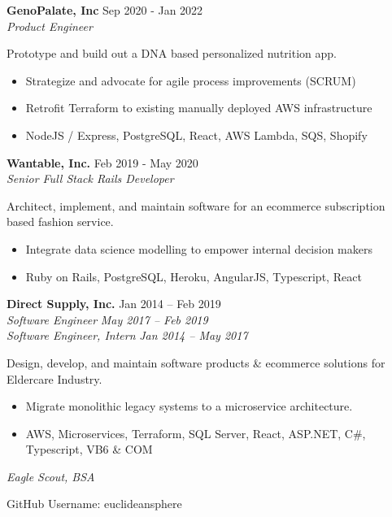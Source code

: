 \documentclass[line,margin]{res}
\begin{document}
\begin{resume}
\textbf{GenoPalate, Inc} \hfill Sep 2020 - Jan 2022 \\
{\sl Product Engineer}

Prototype and build out a DNA based personalized nutrition app.

\begin{itemize}
\item Strategize and advocate for agile process improvements (SCRUM)
\item Retrofit Terraform to existing manually deployed AWS infrastructure
\item NodeJS / Express, PostgreSQL, React, AWS Lambda, SQS, Shopify
\end{itemize}

\textbf{Wantable, Inc.} \hfill Feb 2019 - May 2020 \\
{\sl Senior Full Stack Rails Developer}

Architect, implement, and maintain software for an ecommerce subscription based fashion service.

\begin{itemize}
\item Integrate data science modelling to empower internal decision makers
\item Ruby on Rails, PostgreSQL, Heroku, AngularJS, Typescript, React
\end{itemize}

\textbf{Direct Supply, Inc.} \hfill Jan 2014 -- Feb 2019 \\
{\sl Software Engineer} \hfill {\sl May 2017 -- Feb 2019} \\
{\sl Software Engineer, Intern} \hfill {\sl Jan 2014 -- May 2017}

Design, develop, and maintain software products \& ecommerce solutions for Eldercare Industry.

\begin{itemize}
\item Migrate monolithic legacy systems to a microservice architecture. 
\item AWS, Microservices, Terraform, SQL Server, React, ASP.NET, C\#, Typescript, VB6 \& COM
\end{itemize}




{\sl Eagle Scout, BSA}

GitHub Username: euclideansphere

\end{resume}
\end{document}
